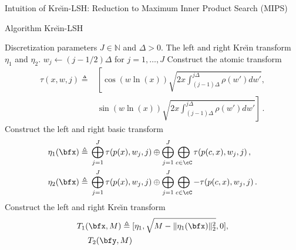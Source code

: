 \documentclass[final]{beamer}
\newcommand{\kr}{Kre\u{\i}n\xspace}
\DeclareMathOperator{\sech}{sech}
\newcommand{\eg}{\emph{e.g.}\xspace}
\newlength{\onecolwid}
\begin{document}
\begin{frame}[t]
\begin{columns}[t]
\begin{column}{\onecolwid}
\begin{block}{Intuition of \kr-LSH: Reduction to Maximum Inner Product Search (MIPS)}
	\end{block}
	\begin{block}{Algorithm \kr-LSH}
			\begin{algorithmic}[1]
				\Require Discretization parameters $ J\in \mathbb{N} $ and $ 
				\Delta>0 $.
				\Ensure The left and right \kr transform $ \eta_1 $ and $ 
				\eta_2 $.
				\State $ w_j \gets (j-1/2)\Delta $ for $ j=1,\dots,J $
				\State Construct the atomic transform \begin{align*}
				\tau(x,w,j)\triangleq{}&
				\left[\cos(w\ln(x))\sqrt{2x\int_{(j-1)\Delta}^{j\Delta} 
					\rho(w')dw'},\right.\\
					& \left.\sin(w\ln(x))\sqrt{ 
					2x\int_{(j-1)\Delta}^{j\Delta} 
					\rho(w')dw' }\right]
				\,.
				\end{align*}
				\State Construct the left and right basic transform 
				\begin{align*}
				\eta_1(\bfx)\triangleq{} & \bigoplus_{j=1}^J 
				\tau(p(x),w_j,j)\oplus 
				\bigoplus_{j=1}^{J} \bigoplus_{c\in \cC} \tau(p(c,x),w_j,j)\,,\\
				\eta_2(\bfx)\triangleq{} & \bigoplus_{j=1}^J 
				\tau(p(x),w_j,j)\oplus 
				\bigoplus_{j=1}^{J} \bigoplus_{c\in \cC} -\tau(p(c,x),w_j,j)\,.
				\end{align*}
				\State Construct the left and right \kr transform
				\begin{align*}
				T_1(\bfx,M) \triangleq{} & 
				[\eta_1,\sqrt{M-\|\eta_1(\bfx)\|^2_2},0],\\ T_2(\bfy,M) 

\end{align*}
\end{algorithmic}
\end{block}
\end{column}
\end{columns}
\end{frame}
\end{document}
